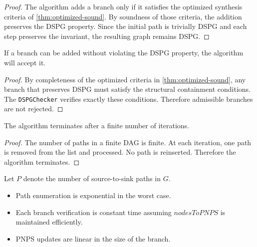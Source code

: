 \begin{proof}
The algorithm adds a branch only if it satisfies the optimized synthesis criteria of \cref{thm:optimized-sound}. By soundness of those criteria, the addition preserves the \ac{DSPG} property. Since the initial path is trivially \ac{DSPG} and each step preserves the invariant, the resulting graph remains \ac{DSPG}.
\end{proof}

\begin{theorem}
\label{thm:alg-complete}
If a branch can be added without violating the \ac{DSPG} property, the algorithm will accept it.
\end{theorem}

\begin{proof}
By completeness of the optimized criteria in \cref{thm:optimized-sound}, any branch that preserves \ac{DSPG} must satisfy the structural containment conditions. The \texttt{DSPGChecker} verifies exactly these conditions. Therefore admissible branches are not rejected.
\end{proof}


\begin{theorem}[Termination]
\label{thm:termination}
The algorithm terminates after a finite number of iterations.
\end{theorem}

\begin{proof}
The number of paths in a finite \ac{DAG} is finite. At each iteration, one path is removed from the list and processed. No path is reinserted. Therefore the algorithm terminates.
\end{proof}


Let $P$ denote the number of source-to-sink paths in $G$.
\begin{itemize}
    \item Path enumeration is exponential in the worst case.
    \item Each branch verification is constant time assuming $nodesToPNPS$ is maintained efficiently.
    \item  \ac{PNPS} updates are linear in the size of the branch.
\end{itemize}

